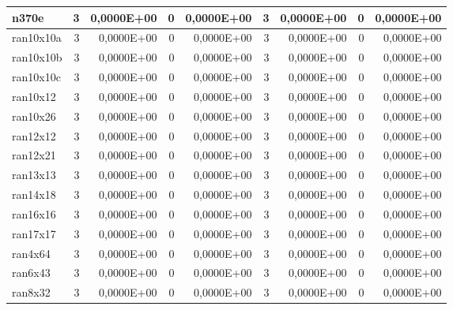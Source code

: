 \begin{tabular}{|l|r|r|r|r|r|r|r|r|}
n370e & 3 & 0,0000E+00 & 0 & 0,0000E+00 & 3 & 0,0000E+00 & 0 & 0,0000E+00 \\ \hline
ran10x10a & 3 & 0,0000E+00 & 0 & 0,0000E+00 & 3 & 0,0000E+00 & 0 & 0,0000E+00 \\ \hline
ran10x10b & 3 & 0,0000E+00 & 0 & 0,0000E+00 & 3 & 0,0000E+00 & 0 & 0,0000E+00 \\ \hline
ran10x10c & 3 & 0,0000E+00 & 0 & 0,0000E+00 & 3 & 0,0000E+00 & 0 & 0,0000E+00 \\ \hline
ran10x12 & 3 & 0,0000E+00 & 0 & 0,0000E+00 & 3 & 0,0000E+00 & 0 & 0,0000E+00 \\ \hline
ran10x26 & 3 & 0,0000E+00 & 0 & 0,0000E+00 & 3 & 0,0000E+00 & 0 & 0,0000E+00 \\ \hline
ran12x12 & 3 & 0,0000E+00 & 0 & 0,0000E+00 & 3 & 0,0000E+00 & 0 & 0,0000E+00 \\ \hline
ran12x21 & 3 & 0,0000E+00 & 0 & 0,0000E+00 & 3 & 0,0000E+00 & 0 & 0,0000E+00 \\ \hline
ran13x13 & 3 & 0,0000E+00 & 0 & 0,0000E+00 & 3 & 0,0000E+00 & 0 & 0,0000E+00 \\ \hline
ran14x18 & 3 & 0,0000E+00 & 0 & 0,0000E+00 & 3 & 0,0000E+00 & 0 & 0,0000E+00 \\ \hline
ran16x16 & 3 & 0,0000E+00 & 0 & 0,0000E+00 & 3 & 0,0000E+00 & 0 & 0,0000E+00 \\ \hline
ran17x17 & 3 & 0,0000E+00 & 0 & 0,0000E+00 & 3 & 0,0000E+00 & 0 & 0,0000E+00 \\ \hline
ran4x64 & 3 & 0,0000E+00 & 0 & 0,0000E+00 & 3 & 0,0000E+00 & 0 & 0,0000E+00 \\ \hline
ran6x43 & 3 & 0,0000E+00 & 0 & 0,0000E+00 & 3 & 0,0000E+00 & 0 & 0,0000E+00 \\ \hline
ran8x32 & 3 & 0,0000E+00 & 0 & 0,0000E+00 & 3 & 0,0000E+00 & 0 & 0,0000E+00 \\ \hline
\end{tabular}

